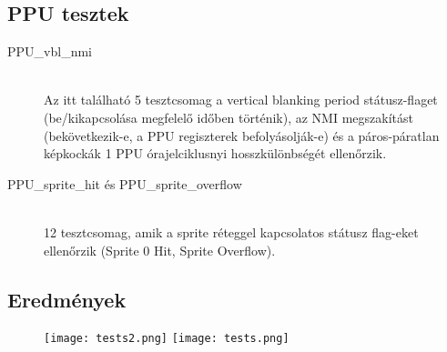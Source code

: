 \subsection{PPU tesztek}

\begin{description}
\item[PPU\_vbl\_nmi] \hfill \\
Az itt található 5 tesztcsomag a vertical blanking period státusz-flaget (be/kikapcsolása megfelelő időben történik), az NMI megszakítást (bekövetkezik-e, a PPU regiszterek befolyásolják-e) és a páros-páratlan képkockák 1 PPU órajelciklusnyi hosszkülönbségét ellenőrzik.

\item[PPU\_sprite\_hit és PPU\_sprite\_overflow] \hfill \\
12 tesztcsomag, amik a sprite réteggel kapcsolatos státusz flag-eket ellenőrzik (Sprite 0 Hit, Sprite Overflow).

\end{description}

\subsection{Eredmények}

\begin{figure}[H]
	\centering
	\texttt{[image: tests2.png]}
	\texttt{[image: tests.png]}
\end{figure}



